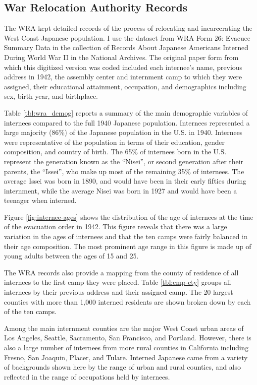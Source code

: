 \subsection{War Relocation Authority Records}

The WRA kept detailed records of the process of relocating and incarcerating 
the West Coast Japanese population.
I use the dataset from WRA Form 26: Evacuee Summary Data in the collection of 
Records About Japanese Americans Interned During World War II 
in the National Archives.
The original paper form from which this digitized version was coded 
included each internee's name, previous address in 1942, 
the assembly center and internment camp to which they were assigned,
their educational attainment, occupation, 
and demographics including sex, birth year, and birthplace.

Table \ref{tbl:wra_demog} reports a summary of the main demographic variables 
of internees compared to the full 1940 Japanese population.
Internees represented a large majority (86\%) 
of the Japanese population in the U.S. in 1940.
Internees were representative of the population in terms of their education, 
gender composition, and country of birth.
The 65\% of internees born in the U.S. 
represent the generation known as the ``Nisei'', 
or second generation after their parents, 
the ``Issei'', who make up most of the remaining 35\% of internees.
The average Issei was born in 1890, 
and would have been in their early fifties during internment,
while the average Nisei was born in 1927 
and would have been a teenager when interned.

Figure \ref{fig:internee-ages} shows the distribution 
of the age of internees at the time of the evacuation order in 1942.
This figure reveals that there was a large variation in the ages of internees 
and that the ten camps were fairly balanced in their age composition.
The most prominent age range in this figure is made up of young adults 
between the ages of 15 and 25. 

The WRA records also provide a mapping from the county of residence of all internees to the first camp they were placed.
Table \ref{tbl:cmp-cty} groups all internees by their previous address and their assigned camp.
The 20 largest counties with more than 1,000 interned residents are shown broken down by each of the ten camps.

Among the main internment counties are the major West Coast urban areas of Los Angeles, Seattle, Sacramento, San Francisco, and Portland.
However, there is also a large number of internees from more rural counties in California including Fresno, San Joaquin, Placer, and Tulare.
Interned Japanese came from a variety of backgrounds shown here by the range of urban and rural counties,
and also reflected in the range of occupations held by internees.


